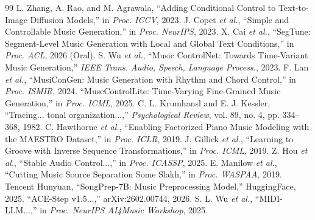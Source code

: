 \documentclass[11pt]{article}
\begin{document}
\begin{thebibliography}{99}
 L. Zhang, A. Rao, and M. Agrawala, ``Adding Conditional Control to Text-to-Image Diffusion Models,'' in \textit{Proc. ICCV}, 2023.
 J. Copet \textit{et al.}, ``Simple and Controllable Music Generation,'' in \textit{Proc. NeurIPS}, 2023.
 X. Cai \textit{et al.}, ``SegTune: Segment-Level Music Generation with Local and Global Text Conditions,'' in \textit{Proc. ACL}, 2026 (Oral).
 S. Wu \textit{et al.}, ``Music ControlNet: Towards Time-Variant Music Generation,'' \textit{IEEE Trans. Audio, Speech, Language Process.}, 2023.
 F. Lan \textit{et al.}, ``MusiConGen: Music Generation with Rhythm and Chord Control,'' in \textit{Proc. ISMIR}, 2024.
 ``MuseControlLite: Time-Varying Fine-Grained Music Generation,'' in \textit{Proc. ICML}, 2025.
 C. L. Krumhansl and E. J. Kessler, ``Tracing... tonal organization...,'' \textit{Psychological Review}, vol. 89, no. 4, pp. 334--368, 1982.
 C. Hawthorne \textit{et al.}, ``Enabling Factorized Piano Music Modeling with the MAESTRO Dataset,'' in \textit{Proc. ICLR}, 2019.
 J. Gillick \textit{et al.}, ``Learning to Groove with Inverse Sequence Transformations,'' in \textit{Proc. ICML}, 2019.
 Z. Hou \textit{et al.}, ``Stable Audio Control...,'' in \textit{Proc. ICASSP}, 2025.
 E. Manilow \textit{et al.}, ``Cutting Music Source Separation Some Slakh,'' in \textit{Proc. WASPAA}, 2019.
 Tencent Hunyuan, ``SongPrep-7B: Music Preprocessing Model,'' HuggingFace, 2025.
 ``ACE-Step v1.5...,'' arXiv:2602.00744, 2026.
 S. L. Wu \textit{et al.}, ``MIDI-LLM...,'' in \textit{Proc. NeurIPS AI4Music Workshop}, 2025.
\end{thebibliography}
\end{document}
